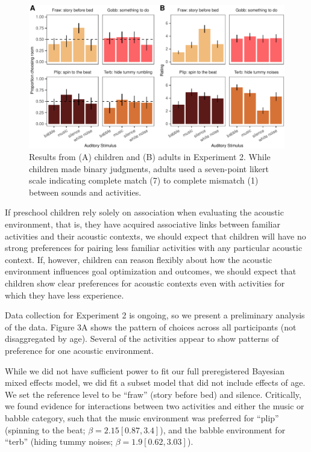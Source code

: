 \documentclass[10pt, letterpaper]{article}
\newenvironment{CodeChunk}{}{}
\begin{document}
\begin{CodeChunk}
\begin{figure}[t]

{\centering \includegraphics{figs/e4-summary-fig-1} 

}

\caption[Results from (A) children and (B) adults in Experiment 2]{Results from (A) children and (B) adults in Experiment 2. While children made binary judgments, adults used a seven-point likert scale indicating complete match (7) to complete mismatch (1) between sounds and activities.}\label{fig:e4-summary-fig}
\end{figure}
\end{CodeChunk}

If preschool children rely solely on association when evaluating the
acoustic environment, that is, they have acquired associative links
between familiar activities and their acoustic contexts, we should
expect that children will have no strong preferences for pairing less
familiar activities with any particular acoustic context. If, however,
children can reason flexibly about how the acoustic environment
influences goal optimization and outcomes, we should expect that
children show clear preferences for acoustic contexts even with
activities for which they have less experience.

Data collection for Experiment 2 is ongoing, so we present a preliminary
analysis of the data. Figure 3A shows the pattern of choices across all
participants (not disaggregated by age). Several of the activities
appear to show patterns of preference for one acoustic environment.

While we did not have sufficient power to fit our full preregistered
Bayesian mixed effects model, we did fit a subset model that did not
include effects of age. We set the reference level to be ``fraw'' (story
before bed) and silence. Critically, we found evidence for interactions
between two activities and either the music or babble category, such
that the music environment was preferred for ``plip'' (spinning to the
beat; \(\beta = 2.15 [0.87, 3.4]\)), and the babble environment for
``terb'' (hiding tummy noises; \(\beta = 1.9 [0.62, 3.03]\)).
\end{document}
